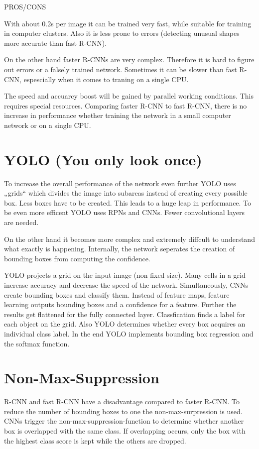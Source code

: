 \documentclass[a4paper,13pt,twoside]{book}
\begin{document}
PROS/CONS

With about 0.2s per image it can be trained very fast, while suitable for training in computer clusters. Also it is less prone to errors (detecting unusual shapes more accurate than fast R-CNN).

On the other hand faster R-CNNs are very complex. Therefore it is hard to figure out  errors or a falsely trained network. Sometimes it can be slower than fast R-CNN, espescially when it comes to traning on a single CPU.

The speed and accuarcy boost will be gained by parallel working conditions. This requires special resources. Comparing faster R-CNN to fast R-CNN, there is no increase in performance whether training the network in a small computer network or on a single CPU.

\section{YOLO (You only look once)}

To increase the overall performance of the network even further YOLO uses „grids“ which divides the image into subareas instead of creating every possible box. Less boxes have to be created. This leads to a huge leap in performance. To be even more efficent YOLO uses RPNs and CNNs. Fewer convolutional layers are needed.

On the other hand it becomes more complex and extremely diffcult to understand what exactly is happening. Internally, the network seperates the creation of bounding boxes from computing the confidence.

YOLO projects a grid on the input image (non fixed size). Many cells in a grid increase accuracy and decrease the speed of the network. Simultaneously, CNNs create bounding boxes and classify them. Instead of feature maps, feature learning outputs bounding boxes and a confidence for a feature. Further the results get flattened for the fully connected layer. Classfication finds a label for each object on the grid. Also YOLO determines whether every box acquires an individual class label. In the end YOLO implements bounding box regression and the softmax function.

\section{Non-Max-Suppression}

R-CNN and fast R-CNN have a disadvantage compared to faster R-CNN. To reduce the number of bounding boxes to one the non-max-surpression is used. CNNs trigger the non-max-suppression-function to determine whether another box is overlapped with the same class. If overlapping occurs, only the box with the highest class score is kept while the others are dropped.
\end{document}
